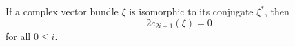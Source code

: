If a complex vector bundle $\xi$ is isomorphic to its conjugate $\xi^*$, then
$$2c_{2i+1}(\xi) = 0$$
for all $0 \leq i$.
